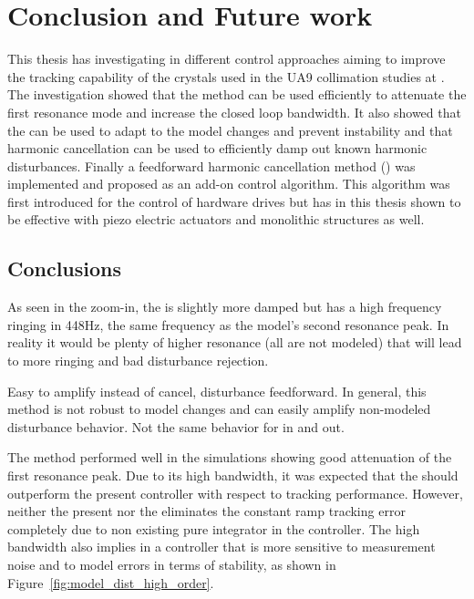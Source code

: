 \chapter{Conclusion and Future work}\label{cha:conclusion}
This thesis has investigating in different control approaches aiming to improve the tracking capability of the crystals used in the UA9 collimation studies at \abbrCERN. The investigation showed that the \abbrIRC method can be used efficiently to attenuate the first resonance mode and increase the closed loop bandwidth. It also showed that the \abbrMRACPE can be used to adapt to the model changes and prevent instability and that harmonic cancellation can be used to efficiently damp out known harmonic disturbances. Finally a feedforward harmonic cancellation method (\abbrRFDC) was implemented and proposed as an add-on control algorithm. This algorithm was first introduced for the control of hardware drives but has in this thesis shown to be effective with piezo electric actuators and monolithic structures as well.

\section{Conclusions}
As seen in the zoom-in, the \abbrIRC is slightly more damped but has a high frequency ringing in 448Hz, the same frequency as the model's second resonance peak. In reality it would be plenty of  higher resonance (all are not modeled) that will lead to more ringing and bad disturbance rejection.

Easy to amplify instead of cancel, disturbance feedforward.  In general, this method is not robust to model changes and can easily amplify non-modeled disturbance behavior. Not the same behavior for in and out.



The \abbrIRC method performed well in the simulations showing good attenuation of the first resonance peak. Due to its high bandwidth, it was expected that the \abbrIRC should outperform the present controller with respect to tracking performance. However, neither the present nor the \abbrIRC eliminates the constant ramp tracking error completely due to non existing pure integrator in the controller. The high bandwidth also implies in a controller that is more sensitive to measurement noise and to model errors in terms of stability, as shown in Figure~\ref{fig:model_dist_high_order}.



